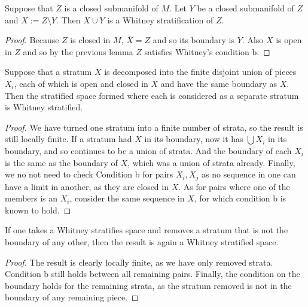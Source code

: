 \begin{lem}
    \label{lem:startified_pair}
Suppose that $Z$ is a closed submanifold of $M$. Let $Y$ be a closed submanifold of $Z$ and $X := Z \setminus Y$. Then $X\cup Y$ is a Whitney stratification of $Z$.

\begin{proof}
Because $Z$ is closed in $M$, $\overline{X} = Z$ and so its boundary is $Y$. Also $X$ is open in $Z$ and so by the previous lemma $Z$ satisfies Whitney's condition b.
\end{proof}
\end{lem}







\begin{lem}
    \label{lem:stratified_split}
Suppose that a stratum $X$ is decomposed into the finite disjoint union of pieces $X_i$, each of which is open and closed in $X$ and have the same boundary as $X$. Then the stratified space formed where each is considered as a separate stratum is Whitney stratified.

\begin{proof}
We have turned one stratum into a finite number of strata, so the result is still locally finite. If a stratum had $X$ in its boundary, now it has $\bigcup X_i$ in its boundary, and so continues to be a union of strata. And the boundary of each $X_i$ is the same as the boundary of $X$, which was a union of strata already. Finally, we no not need to check Condition b for pairs $X_i,X_j$ as no sequence in one can have a limit in another, as they are closed in $X$. As for pairs where one of the members is an $X_i$, consider the same sequence in $X$, for which condition b is known to hold.
\end{proof}
\end{lem}





\begin{lem}
    \label{lem:stratified_remove}
If one takes a Whitney stratifies space and removes a stratum that is not the boundary of any other, then the result is again a Whitney stratified space.

\begin{proof}
The result is clearly locally finite, as we have only removed strata. Condition b still holds between all remaining pairs. Finally, the condition on the boundary holds for the remaining strata, as the stratum removed is not in the boundary of any remaining piece.
\end{proof}
\end{lem}







